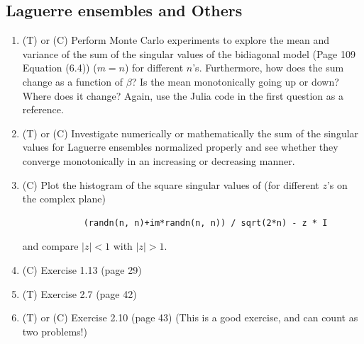 \documentclass{article}
\begin{document}
\subsection*{Laguerre ensembles and Others}

\begin{enumerate}
    \item (T) or (C) Perform Monte Carlo experiments to explore the mean and variance of the sum of the singular values of the bidiagonal model (Page 109  Equation (6.4)) ($m = n$) for different $n$'s. Furthermore, how does the sum change as a function of $\beta$? Is the mean monotonically going up or down? Where does it change? Again, use the Julia code in the first question as a reference.
    \item (T) or (C) Investigate numerically or mathematically the sum of the singular values for Laguerre ensembles normalized properly and see whether they converge monotonically in an increasing or decreasing manner.
    \item (C) Plot the histogram of the square singular values of (for different $z$'s on the complex plane)
        \begin{verbatim}
            (randn(n, n)+im*randn(n, n)) / sqrt(2*n) - z * I
        \end{verbatim} and compare $|z|<1$ with $|z|>1$.
    \item (C) Exercise 1.13 (page 29)
    \item (T) Exercise 2.7 (page 42)
   \item (T) or (C) Exercise 2.10 (page 43) (This is a good exercise, and can count as two problems!)
   
\end{enumerate}
 
\end{document}
